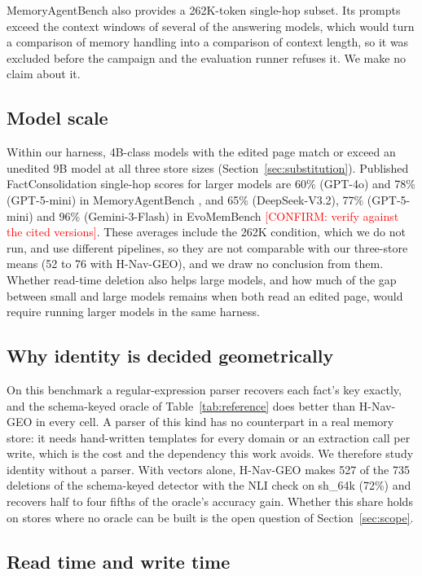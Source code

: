 \documentclass[11pt]{article}
\newcommand{\sub}[1]{\textsf{sh\_#1}}                    %
\newcommand{\geo}{H-Nav-GEO}
\newcommand{\confirm}[1]{\textcolor{red}{[CONFIRM: #1]}} %
\begin{document}
MemoryAgentBench also provides a 262K-token single-hop subset. Its prompts exceed the context windows of several of the answering models, which would turn a comparison of memory handling into a comparison of context length, so it was excluded before the campaign and the evaluation runner refuses it. We make no claim about it.

\subsection{Model scale}
\label{sec:scale}

Within our harness, 4B-class models with the edited page match or exceed an unedited 9B model at all three store sizes (Section~\ref{sec:substitution}). Published FactConsolidation single-hop scores for larger models are 60\% (GPT-4o) and 78\% (GPT-5-mini) in MemoryAgentBench \cite{hu2026memoryagentbench}, and 65\% (DeepSeek-V3.2), 77\% (GPT-5-mini) and 96\% (Gemini-3-Flash) in EvoMemBench \cite{wang2026evomembench} \confirm{verify against the cited versions}. These averages include the 262K condition, which we do not run, and use different pipelines, so they are not comparable with our three-store means (52 to 76 with \geo{}), and we draw no conclusion from them. Whether read-time deletion also helps large models, and how much of the gap between small and large models remains when both read an edited page, would require running larger models in the same harness.

\subsection{Why identity is decided geometrically}
\label{sec:parser}

On this benchmark a regular-expression parser recovers each fact's key exactly, and the schema-keyed oracle of Table~\ref{tab:reference} does better than \geo{} in every cell. A parser of this kind has no counterpart in a real memory store: it needs hand-written templates for every domain or an extraction call per write, which is the cost and the dependency this work avoids. We therefore study identity without a parser. With vectors alone, \geo{} makes 527 of the 735 deletions of the schema-keyed detector with the NLI check on \sub{64k} (72\%) and recovers half to four fifths of the oracle's accuracy gain. Whether this share holds on stores where no oracle can be built is the open question of Section~\ref{sec:scope}.

\subsection{Read time and write time}
\label{sec:readwrite}
\end{document}
